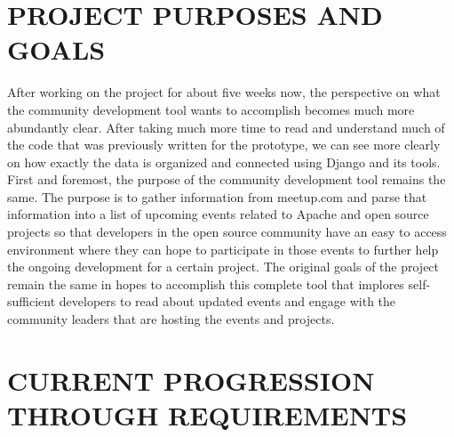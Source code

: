 \documentclass[letterpaper,10pt,onecolumn]{IEEEtran} %
\begin{document}
\section{PROJECT PURPOSES AND GOALS}
After working on the project for about five weeks now, the perspective on what the community development tool wants to accomplish becomes much more abundantly clear. After taking much more time to read and understand much of the code that was previously written for the prototype, we can see more clearly on how exactly the data is organized and connected using Django and its tools. First and foremost, the purpose of the community development tool remains the same. The purpose is to gather information from meetup.com and parse that information into a list of upcoming events related to Apache and open source projects so that developers in the open source community have an easy to access environment where they can hope to participate in those events to further help the ongoing development for a certain project. The original goals of the project remain the same in hopes to accomplish this complete tool that implores self-sufficient developers to read about updated events and engage with the community leaders that are hosting the events and projects.

\section{CURRENT PROGRESSION THROUGH REQUIREMENTS}
\end{document}
